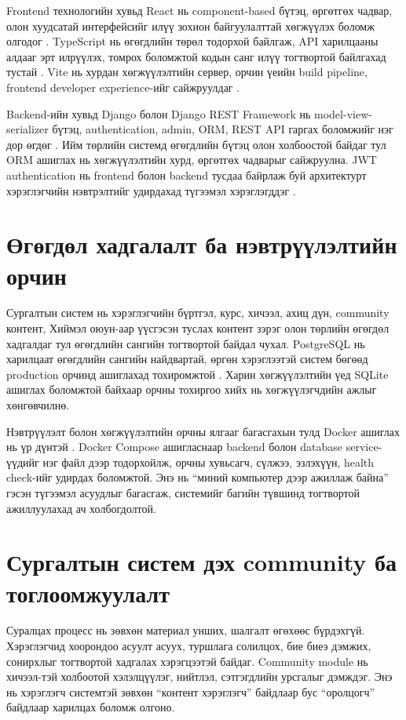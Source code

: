 Frontend технологийн хувьд React нь component-based бүтэц, өргөтгөх чадвар, олон хуудсатай интерфейсийг илүү зохион байгуулалттай хөгжүүлэх боломж олгодог \cite{react}. TypeScript нь өгөгдлийн төрөл тодорхой байлгаж, API харилцааны алдааг эрт илрүүлэх, томрох боломжтой кодын санг илүү тогтвортой байлгахад тустай \cite{typescript}. Vite нь хурдан хөгжүүлэлтийн сервер, орчин үеийн build pipeline, frontend developer experience-ийг сайжруулдаг \cite{vite}.

Backend-ийн хувьд Django болон Django REST Framework нь model-view-serializer бүтэц, authentication, admin, ORM, REST API гаргах боломжийг нэг дор өгдөг \cite{django,drf}. Ийм төрлийн системд өгөгдлийн бүтэц олон холбоостой байдаг тул ORM ашиглах нь хөгжүүлэлтийн хурд, өргөтгөх чадварыг сайжруулна. JWT authentication нь frontend болон backend тусдаа байрлаж буй архитектурт хэрэглэгчийн нэвтрэлтийг удирдахад түгээмэл хэрэглэгддэг \cite{jwt}.

\section{Өгөгдөл хадгалалт ба нэвтрүүлэлтийн орчин}
Сургалтын систем нь хэрэглэгчийн бүртгэл, курс, хичээл, ахиц дүн, community контент, Хиймэл оюун-аар үүсгэсэн туслах контент зэрэг олон төрлийн өгөгдөл хадгалдаг тул өгөгдлийн сангийн тогтвортой байдал чухал. PostgreSQL нь харилцаат өгөгдлийн сангийн найдвартай, өргөн хэрэглээтэй систем бөгөөд production орчинд ашиглахад тохиромжтой \cite{postgres}. Харин хөгжүүлэлтийн үед SQLite ашиглах боломжтой байхаар орчны тохиргоо хийх нь хөгжүүлэгчдийн ажлыг хөнгөвчилнө.

Нэвтрүүлэлт болон хөгжүүлэлтийн орчны ялгааг багасгахын тулд Docker ашиглах нь үр дүнтэй \cite{docker}. Docker Compose ашигласнаар backend болон database service-үүдийг нэг файл дээр тодорхойлж, орчны хувьсагч, сүлжээ, эзлэхүүн, health check-ийг удирдах боломжтой. Энэ нь ``миний компьютер дээр ажиллаж байна'' гэсэн түгээмэл асуудлыг багасгаж, системийг багийн түвшинд тогтвортой ажиллуулахад ач холбогдолтой.

\section{Сургалтын систем дэх community ба тоглоомжуулалт}
Суралцах процесс нь зөвхөн материал унших, шалгалт өгөхөөс бүрдэхгүй. Хэрэглэгчид хоорондоо асуулт асуух, туршлага солилцох, бие биеэ дэмжих, сонирхлыг тогтвортой хадгалах хэрэгцээтэй байдаг. Community module нь хичээл-тэй холбоотой хэлэлцүүлэг, нийтлэл, сэтгэгдлийн урсгалыг дэмждэг. Энэ нь хэрэглэгч системтэй зөвхөн ``контент хэрэглэгч'' байдлаар бус ``оролцогч'' байдлаар харилцах боломж олгоно.

